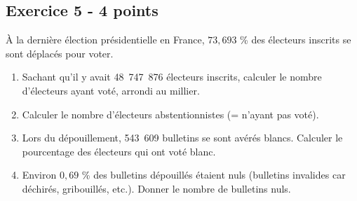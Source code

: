 \documentclass[14 pt]{extarticle}
\theoremstyle{plain}
\begin{document}
 \subsection*{Exercice 5 - 4 points}
 
 À la dernière élection présidentielle en France, $73,693$ \% des électeurs inscrits se sont déplacés pour voter. \begin{enumerate}
 \item Sachant qu'il y avait 48~747~876 électeurs inscrits, calculer le nombre d'électeurs ayant voté, arrondi au millier. 
 \item Calculer le nombre d'électeurs abstentionnistes (= n'ayant pas voté).
 \item Lors du dépouillement, 543~609 bulletins se sont avérés blancs. Calculer le pourcentage des électeurs qui ont voté blanc.
 \item Environ $0,69$ \% des bulletins dépouillés étaient nuls (bulletins invalides car déchirés, gribouillés, etc.). Donner le nombre de bulletins nuls. 
 \end{enumerate}
 	
\end{document}

